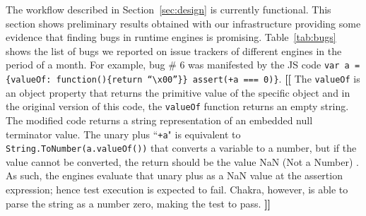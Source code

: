 \documentclass[11pt]{article}
\newcommand{\Igor}[1]{\textbf{[[}{\color{darkaquamarine} #1}\textbf{]]}}
\newcommand{\CodeIn}[1]{{\small\texttt{#1}}}
\begin{document}
The workflow described in Section~\ref{sec:design} is currently functional. This section shows preliminary
results obtained with our infrastructure providing some evidence that finding bugs in runtime engines is
promising. Table~\ref{tab:bugs} shows the list of bugs we reported on
issue trackers of different engines in the period of a month. For
example, bug \# 6 was manifested by the JS code \CodeIn{var a =
  \{valueOf:~function()\{return ``\textbackslash{}x00''\}\} assert(+a
  === 0)\}}. 
\Igor{
  The \CodeIn{valueOf} is an object property that returns the primitive value
  of the specific object\cite{valueof} and in the original version of this code,
  the \CodeIn{valueOf} function returns an empty string.
  The modified code returns a string representation of an embedded null terminator
  value. 
  The unary plus ``\CodeIn{+a}" is equivalent to \CodeIn{String.ToNumber(a.valueOf())} 
  that converts a variable to a number, but if the value cannot be converted, 
  the return should be the value NaN (Not a Number) \cite{unary-plus}.
  As such, the engines evaluate that unary plus as a NaN value 
  at the assertion expression; hence test execution is expected to fail. 
  Chakra, however, is able to parse the string as a number zero, making the test to pass.
}
\newcommand{\checkm}{Y}
\newcommand{\crossmark}{N}
\end{document}

